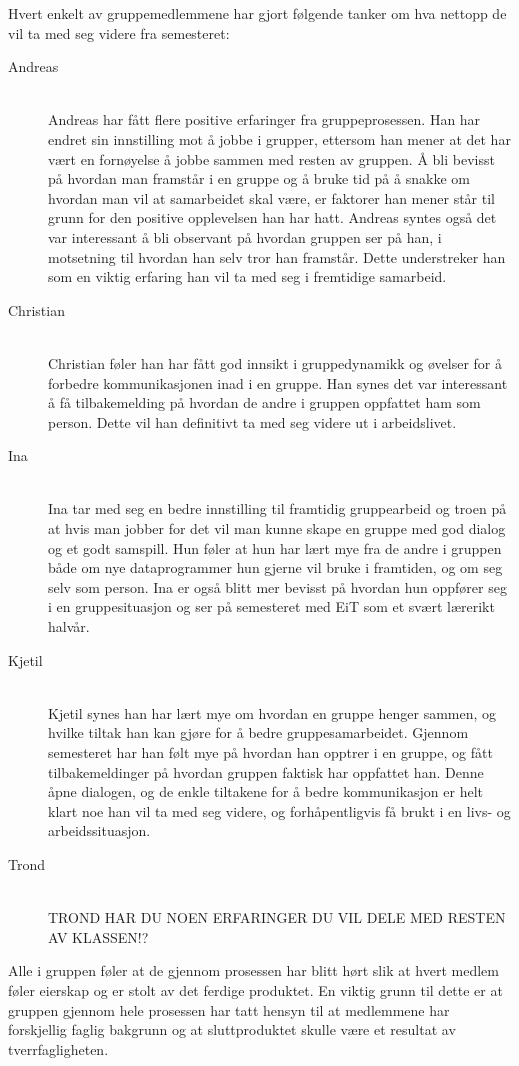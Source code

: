 Hvert enkelt av gruppemedlemmene har gjort følgende tanker om hva nettopp de vil ta med seg videre fra semesteret:
\begin{description}
\item[Andreas] \hfill \\
Andreas har fått flere positive erfaringer fra gruppeprosessen. Han har endret sin innstilling mot å jobbe i grupper, ettersom han mener at det har vært en fornøyelse å jobbe sammen med resten av gruppen. Å bli bevisst på hvordan man framstår i en gruppe og å bruke tid på å snakke om hvordan man vil at samarbeidet skal være, er faktorer han mener står til grunn for den positive opplevelsen han har hatt. Andreas syntes også det var interessant å bli observant på hvordan gruppen ser på han, i motsetning til hvordan han selv tror han framstår. Dette understreker han som en viktig erfaring han vil ta med seg i fremtidige samarbeid.

\item[Christian] \hfill \\
Christian føler han har fått god innsikt i gruppedynamikk og øvelser for å forbedre kommunikasjonen inad i en gruppe. Han synes det var interessant å få tilbakemelding på hvordan de andre i gruppen oppfattet ham som person. Dette vil han definitivt ta med seg videre ut i arbeidslivet.  

\item[Ina] \hfill \\
Ina tar med seg en bedre innstilling til framtidig gruppearbeid og troen på at hvis man jobber for 
det vil man kunne skape en gruppe med god dialog og et godt samspill. Hun føler at hun har lært mye fra de andre
i gruppen både om nye dataprogrammer hun gjerne vil bruke i framtiden, og om seg selv som person.
Ina er også blitt mer bevisst på hvordan hun oppfører seg i en gruppesituasjon og ser på semesteret med
EiT som et svært lærerikt halvår.

\item[Kjetil] \hfill \\
Kjetil synes han har lært mye om hvordan en gruppe henger sammen, og
hvilke tiltak han kan gjøre for å bedre gruppesamarbeidet. Gjennom
semesteret har han følt mye på hvordan han opptrer i en gruppe, og fått
tilbakemeldinger på hvordan gruppen faktisk har oppfattet han. Denne
åpne dialogen, og de enkle tiltakene for å bedre kommunikasjon er helt
klart noe han vil ta med seg videre, og forhåpentligvis få brukt i en
livs- og arbeidssituasjon.

\item[Trond] \hfill \\
TROND HAR DU NOEN ERFARINGER DU VIL DELE MED RESTEN AV KLASSEN!?

\end{description}
Alle i gruppen føler at de gjennom prosessen har blitt hørt slik at hvert medlem føler eierskap og er stolt av det ferdige produktet. 
En viktig grunn til dette er at gruppen gjennom hele prosessen har tatt hensyn til at medlemmene har forskjellig faglig bakgrunn og 
at sluttproduktet skulle være et resultat av tverrfagligheten.


